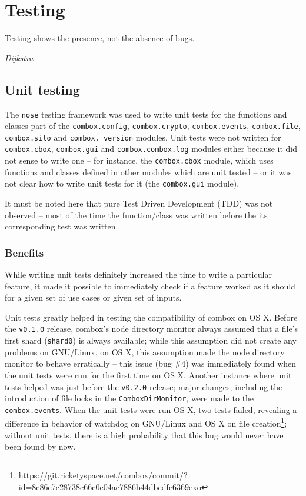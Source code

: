 \chapter{Testing}\label{ch:4}

\epigraph{Testing shows the presence, not the absence of
  bugs.}{\textit{Dijkstra}\cite{dijkstra69}}

\section{Unit testing}\label{sec:4-unit-testing}

The \verb+nose+\cite{pylib:nose} testing framework was used to write
unit tests for the functions and classes part of the
\verb+combox.config+, \verb+combox.crypto+, \verb+combox.events+,
\verb+combox.file+, \verb+combox.silo+ and \verb+combox._version+
modules. Unit tests were not written for \verb+combox.cbox+,
\verb+combox.gui+ and \verb+combox.combox.log+ modules either because
it did not sense to write one -- for instance, the \verb+combox.cbox+
module, which uses functions and classes defined in other modules
which are unit tested -- or it was not clear how to write unit tests
for it (the \verb+combox.gui+ module).

It must be noted here that pure Test Driven Development (TDD) was not
observed -- most of the time the function/class was written before the
its corresponding test was written.

\subsection{Benefits}

While writing unit tests definitely increased the time to write a
particular feature, it made it possible to immediately check if a
feature worked as it should for a given set of use cases or given set
of inputs.

Unit tests greatly helped in testing the compatibility of combox on OS
X. Before the \verb+v0.1.0+ release, combox's node directory monitor
always assumed that a file's first shard (\verb+shard0+) is always
available; while this assumption did not create any problems on
GNU/Linux, on OS X, this assumption made the node directory monitor to
behave erratically -- this issue (bug \#4) was immediately found when
the unit tests were run for the first time on OS X. Another instance
where unit tests helped was just before the \verb+v0.2.0+ release;
major changes, including the introduction of file locks in the
\verb+ComboxDirMonitor+, were made to the \verb+combox.events+. When
the unit tests were run OS X, two tests failed, revealing a difference
in behavior of watchdog\cite{pylib:watchdog} on GNU/Linux and OS X on
file
creation\footnote{https://git.ricketyspace.net/combox/commit/?id=8c86e7c28738c66c0e04ae7886b44dbcdfc6369exo};
without unit tests, there is a high probability that this bug would
never have been found by now.


